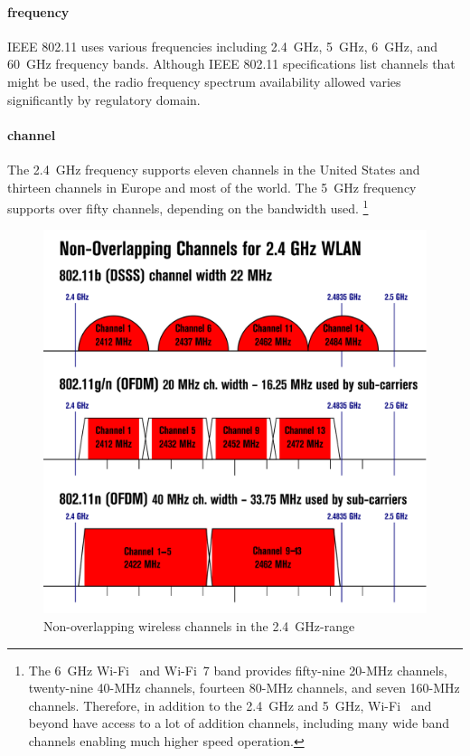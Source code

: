 \paragraph{frequency}
\acs{IEEE} 802.11 uses various frequencies including \SI{2.4}{\giga\hertz}, \SI{5}{\giga\hertz}, \SI{6}{\giga\hertz}, and \SI{60}{\giga\hertz} frequency bands.
Although \acs{IEEE} 802.11 specifications list channels that might be used, the radio frequency spectrum availability allowed varies significantly by regulatory domain.

\paragraph{channel}
The \SI{2.4}{\giga\hertz} frequency supports eleven channels in the United States and thirteen channels in Europe and most of the world.
The \SI{5}{\giga\hertz} frequency supports over fifty channels, depending on the bandwidth used.%
   \footnote{%
   The \SI{6}{\giga\hertz} Wi-Fi~ and Wi-Fi~7 band provides fifty-nine 20-MHz channels, twenty-nine 40-MHz channels, fourteen 80-MHz channels, and seven 160-MHz channels.
   Therefore, in addition to the \SI{2.4}{\giga\hertz} and \SI{5}{\giga\hertz}, Wi-Fi~ and beyond have access to a lot of addition channels, including many wide band channels enabling much higher speed operation.
   }

\begin{figure}
\centering
\includegraphics[width=\textwidth]{images/physical/wifi-channels.png}
\caption{Non-overlapping wireless channels in the \SI{2.4}{\giga\hertz}-range}
\label{fig:wifi-channels}
\end{figure}

